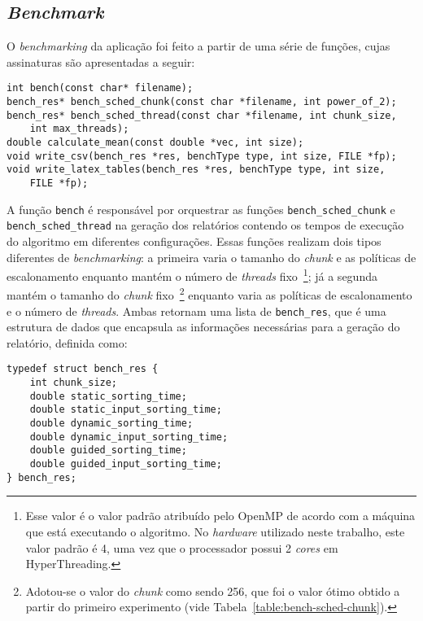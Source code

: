 \documentclass[12pt,a4paper]{article}
\begin{document}
\subsection{\textit{Benchmark}}
O \textit{benchmarking} da aplicação foi feito a partir de uma série de funções,
cujas assinaturas são apresentadas a seguir:

\begin{verbatim}
int bench(const char* filename);
bench_res* bench_sched_chunk(const char *filename, int power_of_2);
bench_res* bench_sched_thread(const char *filename, int chunk_size,
    int max_threads);
double calculate_mean(const double *vec, int size);
void write_csv(bench_res *res, benchType type, int size, FILE *fp);
void write_latex_tables(bench_res *res, benchType type, int size,
    FILE *fp);
\end{verbatim}

A função \texttt{bench} é responsável por orquestrar as funções
\texttt{bench\_sched\_chunk} e \texttt{bench\_sched\_thread} na geração dos
relatórios contendo os tempos de execução do algoritmo em diferentes
configurações. Essas funções realizam dois tipos diferentes de
\textit{benchmarking}: a primeira varia o tamanho do \textit{chunk} e as
políticas de escalonamento enquanto mantém o número de \textit{threads}
fixo~\footnote{Esse valor é o valor padrão atribuído pelo OpenMP de acordo com a
máquina que está executando o algoritmo. No \textit{hardware} utilizado neste
trabalho, este valor padrão é 4, uma vez que o processador possui 2
\textit{cores} em HyperThreading.}; já a segunda mantém o tamanho do
\textit{chunk} fixo~\footnote{Adotou-se o valor do \textit{chunk} como sendo
256, que foi o valor ótimo obtido a partir do primeiro experimento (vide
Tabela~\ref{table:bench-sched-chunk}).} enquanto varia as políticas de
escalonamento e o número de \textit{threads}. Ambas retornam uma lista de
\texttt{bench\_res}, que é uma estrutura de dados que encapsula as informações
necessárias para a geração do relatório, definida como:

\begin{verbatim}
typedef struct bench_res {
    int chunk_size;
    double static_sorting_time;
    double static_input_sorting_time;
    double dynamic_sorting_time;
    double dynamic_input_sorting_time;
    double guided_sorting_time;
    double guided_input_sorting_time;
} bench_res;
\end{verbatim}
\end{document}
